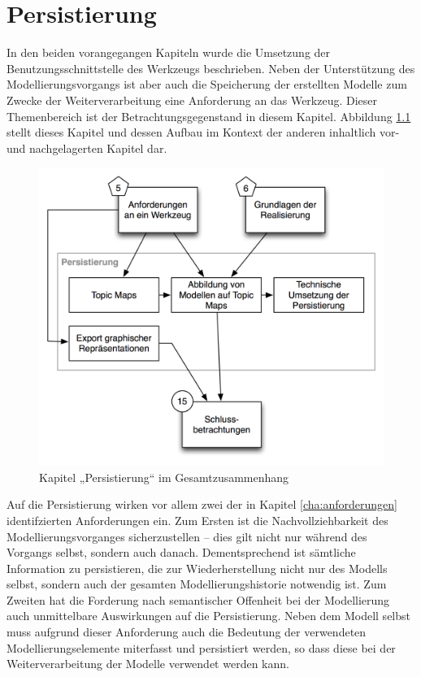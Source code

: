 
\chapter{Persistierung} %
\label{cha:persistierung}

In den beiden vorangegangen Kapiteln wurde die Umsetzung der Benutzungsschnittstelle des Werkzeugs beschrieben. Neben der Unterstützung des Modellierungsvorgangs ist aber auch die Speicherung der erstellten Modelle zum Zwecke der Weiterverarbeitung eine Anforderung an das Werkzeug. Dieser Themenbereich ist der Betrachtungsgegenstand in diesem Kapitel. Abbildung \ref{fig:img_Kontextgrafiken_k9} stellt dieses Kapitel und dessen Aufbau im Kontext der anderen inhaltlich vor- und nachgelagerten Kapitel dar.

\begin{figure}[htbp]
	\centering
		\includegraphics[scale=0.6]{img/Kontextgrafiken/k9.png}
	\caption{Kapitel „Persistierung“ im Gesamtzusammenhang}
	\label{fig:img_Kontextgrafiken_k9}
\end{figure}

Auf die Persistierung wirken vor allem zwei der in Kapitel \ref{cha:anforderungen} identifzierten Anforderungen ein. Zum Ersten ist die Nachvollziehbarkeit des Modellierungsvorganges sicherzustellen -- dies gilt nicht nur während des Vorgangs selbst, sondern auch danach. Dementsprechend ist sämtliche Information zu persistieren, die zur Wiederherstellung nicht nur des Modells selbst, sondern auch der gesamten Modellierungshistorie notwendig ist. Zum Zweiten hat die Forderung nach semantischer Offenheit bei der Modellierung auch unmittelbare Auswirkungen auf die Persistierung. Neben dem Modell selbst muss aufgrund dieser Anforderung auch die Bedeutung der verwendeten Modellierungselemente miterfasst und persistiert werden, so dass diese bei der Weiterverarbeitung der Modelle verwendet werden kann.

